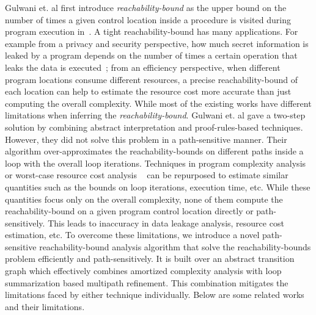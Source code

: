 
Gulwani et. al first introduce \emph{reachability-bound} as the upper bound on the number of times a given control location 
inside a procedure is visited during program execution in~\cite{GulwaniZ10}.
A tight reachability-bound has many applications.
For example from a privacy and security perspective,
how much secret information is leaked by a program depends on the number of times a certain operation that leaks the data
is executed~\cite{Malacaria07};
from an efficiency perspective, when different program locations consume different resources, a precise reachability-bound of each location can help to estimate the resource cost more accurate than just computing the overall complexity.
While most of the existing works have different limitations when inferring the \emph{reachability-bound}.
Gulwani et. al
gave a two-step solution by combining abstract interpretation and proof-rules-based techniques. However, they did not solve this problem in a path-sensitive manner.
Their algorithm over-approximates the reachability-bounds on different paths inside a loop with the overall loop iterations.
Techniques in program complexity analysis~\cite{GustafssonEL05,HumenbergerJK18} 
or worst-case resource cost analysis
~\cite{BrockschmidtEFFG16,AlbertAGP08,AliasDFG10,Flores-MontoyaH14} can be repurposed to estimate similar quantities such as the
bounds on loop iterations, execution time, etc.
While these quantities focus only on  
the overall complexity,
none of them compute the reachability-bound on a given program control location directly or path-sensitively.
This leads to inaccuracy in data leakage analysis, resource cost estimation, etc.
To overcome these limitations, 
we introduce a novel path-sensitive reachability-bound analysis algorithm that solve 
the reachability-bounds problem efficiently and path-sensitively.
It is built over an abstract transition graph which effectively combines amortized complexity analysis with loop summarization based multipath refinement.
This combination mitigates the limitations faced by either technique individually. Below are some related works and their limitations.

